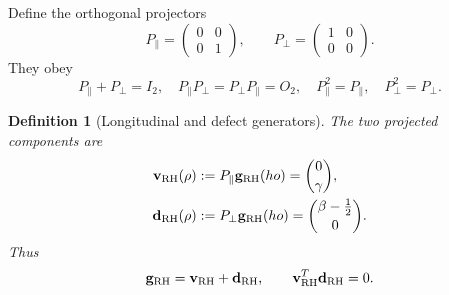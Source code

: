 \documentclass[11pt]{article}
\newtheorem{definition}{Definition}[section]
\begin{document}
Define the orthogonal projectors
\begin{equation}\label{eq:projectors}
 P_{\parallel}=\begin{pmatrix}0&0\\0&1\end{pmatrix},\qquad
 P_{\perp}=\begin{pmatrix}1&0\\0&0\end{pmatrix}.
\end{equation}
They obey
\begin{equation}
 P_{\parallel}+P_{\perp}=I_2,\quad
 P_{\parallel}P_{\perp}=P_{\perp}P_{\parallel}=O_2,\quad
 P_{\parallel}^2=P_{\parallel},\quad P_{\perp}^2=P_{\perp}.
\end{equation}

\begin{definition}[Longitudinal and defect generators]\label{def:components}
The two projected components are
\begin{align}
 \mathbf v_{\rm RH}(\rho)
  &:=P_{\parallel}\mathbf g_{\rm RH}(
ho)=\binom0\gamma,
  \label{eq:longitudinal}\\
 \mathbf d_{\rm RH}(\rho)
  &:=P_{\perp}\mathbf g_{\rm RH}(
ho)
    =\binom{\beta-\tfrac12}{0}.
  \label{eq:defect}
\end{align}
Thus
\begin{equation}\label{eq:orthogonal-decomposition}
 \mathbf g_{\rm RH}=\mathbf v_{\rm RH}+\mathbf d_{\rm RH},\qquad
 \mathbf v_{\rm RH}^{T}\mathbf d_{\rm RH}=0.
\end{equation}
\end{definition}
\end{document}
